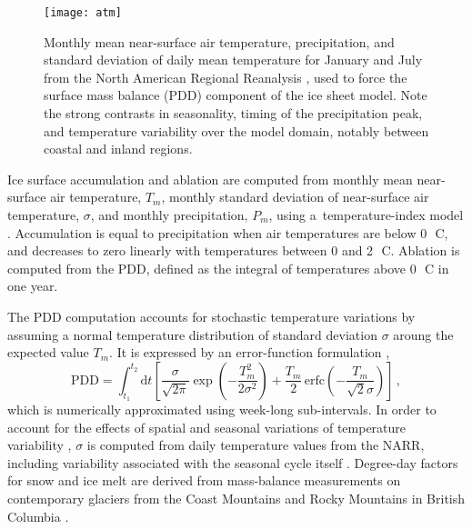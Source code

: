 \documentclass[tc]{copernicus}
\begin{document}
\begin{figure}
  \texttt{[image: atm]}
  \caption{Monthly mean near-surface air temperature, precipitation, and
           standard deviation of daily mean temperature for January and July
           from the North American Regional Reanalysis
           \citep[NARR;][]{Mesinger.etal.2006}, used to force the surface mass
           balance (PDD) component of the ice sheet model. Note the
           strong contrasts in seasonality, timing of the precipitation peak,
           and temperature variability over the model domain, notably between
           coastal and inland regions.}
  \label{fig:atm}
\end{figure}

Ice surface accumulation and ablation are computed from monthly mean
near-surface air temperature, $T_m$, monthly standard deviation of near-surface
air temperature, $\sigma$, and monthly precipitation, $P_m$, using
a~temperature-index model \citep[e.g.,][]{Hock.2003}.
Accumulation is equal to
precipitation when air temperatures are below 0\,\unit{{\degree}C}, and
decreases to zero linearly with temperatures between 0 and
2\,\unit{{\degree}C}. Ablation is computed from the PDD, defined as the
integral of temperatures above 0\,\unit{{\degree}C} in one year.

The PDD computation accounts for stochastic temperature variations by assuming
a normal temperature distribution of standard deviation $\sigma$ aroung the
expected value $T_m$. It is expressed by an error-function formulation
\citep{Calov.Greve.2005},
\begin{equation}
    \label{eqn:calovgreve}
    \mathrm{PDD} = \int_{t_1}^{t_2} \mathrm{d}t
        \left[\frac{\sigma}{\sqrt{2\pi}}
                \exp\left({-\frac{T_{m}^2}{2\sigma^2}}\right)
              + \frac{T_{m}}{2} \, \mathrm{erfc}
                \left(-\frac{T_{m}}{\sqrt{2}\sigma}\right)\right] \,,
\end{equation}
which is numerically approximated using week-long sub-intervals. In order to
account for the effects of spatial and seasonal variations of temperature
variability \citep{Seguinot.2013}, $\sigma$ is computed from daily temperature
values from the NARR, including variability associated with the seasonal cycle
itself \citep[Fig.~\ref{fig:atm}; i.e. not as in][]{Seguinot.Rogozhina.2014}.
Degree-day factors for snow and ice melt are derived from
mass-balance measurements on contemporary glaciers from the Coast Mountains and
Rocky Mountains in British Columbia
\citep[Table~\ref{tab:params};][]{Shea.etal.2009}.
\end{document}
